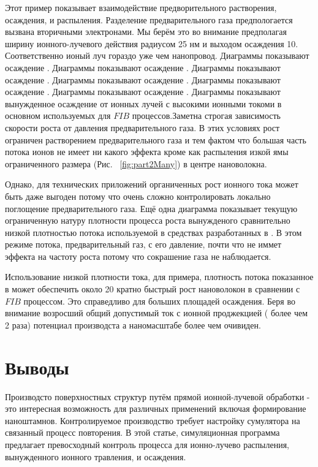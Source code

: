 \documentclass[a4paper,fontsize=12pt]{article}
\begin{document}
\newpage

Этот пример показывает взаимодействие предворительного растворения, осаждения, и распыления. Разделение предварительного газа предпологается вызвана вторичными электронами. Мы берём это во внимание предполагая ширину ионного-лучевого действия радиусом 25 нм и выходом осаждения 10. Соответственно ионый луч гораздо уже чем нанопровод. Диаграммы показывают осаждение . Диаграммы показывают осаждение . Диаграммы показывают осаждение . Диаграммы показывают осаждение . Диаграммы показывают осаждение . Диаграммы показывают осаждение . Диаграммы показывают вынужденное осаждение от ионных лучей с высокими ионными токоми в основном используемых для $FIB$ процессов.Заметна строгая зависимость скорости роста от давления предварительного газа. В этих условиях рост ограничен растворением предварительного газа и тем фактом что большая часть потока ионов не имеет ни какого эффекта кроме как распыления изкой ямы ограниченного размера (Рис. ~\ref{fig:part2Many}) в центре нановолокна.

Однако, для технических приложений органиченных рост ионного тока может быть даже выгоден потому что очень сложно контролировать локально поглощение предварительного газа. Ещё одна диаграмма показывает текущую ограниченную натуру плотности процесса роста вынужденого сравнительно низкой плотностью потока используемой в средствах разработанных в \charpan{}. В этом режиме потока, предварительный газ, с его давление, почти что не иммет эффекта на частоту роста потому что сокрашение газа не наблюдается.

Использование низкой плотности тока, для примера, плотность потока показанное в \charpan{} может обеспечить около 20 кратно быстрый рост нановолокон в сравнении с $FIB$ процессом. Это справедливо для больших площадей осаждения. Беря во внимание возросший общий допустимый ток с ионной проджекцией ( более чем 2 раза) потенциал производста а наномасштабе более чем очивиден.

\section{Выводы}

Производсто \dt{} поверхностных структур путём прямой ионной-лучевой обработки - это интересная возможность для различных применений включая формирование наноштамнов. Контролируемое \dt{} производство требует настройку сумулятора на связанный процесс повторения.  В этой статье, симуляционная программа \ion{} предлагает превосходный контроль процесса для ионно-лучево распыления, вынужденного ионного травления, и осаждения.
\end{document}
